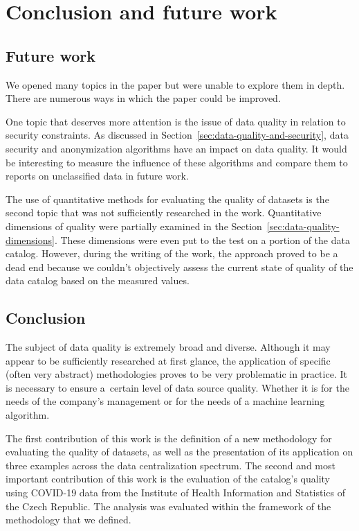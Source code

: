 \chapter{Conclusion and future work}\label{ch:conclusion-and-future-work}

\section{Future work}\label{sec:future-work}

We opened many topics in the paper but were unable to explore them in depth.
There are numerous ways in which the paper could be improved.

One topic that deserves more attention is the issue of data quality in relation to security constraints.
As discussed in Section~\ref{sec:data-quality-and-security}, data security and anonymization algorithms have an impact on data quality.
It would be interesting to measure the influence of these algorithms and compare them to reports on unclassified data in future work.

The use of quantitative methods for evaluating the quality of datasets is the second topic that was not sufficiently researched in the work.
Quantitative dimensions of quality were partially examined in the Section~\ref{sec:data-quality-dimensions}.
These dimensions were even put to the test on a portion of the data catalog.
However, during the writing of the work, the approach proved to be a dead end because we couldn't objectively assess the current state of quality of the data catalog based on the measured values.

\section{Conclusion}\label{sec:conclusion}

The subject of data quality is extremely broad and diverse.
Although it may appear to be sufficiently researched at first glance, the application of specific (often very abstract) methodologies proves to be very problematic in practice.
It is necessary to ensure a~certain level of data source quality.
Whether it is for the needs of the company's management or for the needs of a machine learning algorithm.

The first contribution of this work is the definition of a new methodology for evaluating the quality of datasets, as well as the presentation of its application on three examples across the data centralization spectrum.
The second and most important contribution of this work is the evaluation of the catalog's quality using COVID-19 data from the Institute of Health Information and Statistics of the Czech Republic.
The analysis was evaluated within the framework of the methodology that we defined.

